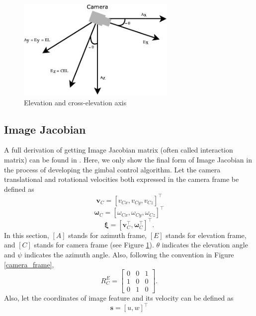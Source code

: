 \begin{figure}[htbp]
	\centering
	\includegraphics[width = 3in]{images/chapter2/cross_elevation.pdf}
	\caption{Elevation and cross-elevation axis}
	\label{cross_elevation}
\end{figure}
\subsection{Image Jacobian}
A full derivation of getting Image Jacobian matrix (often called interaction matrix) can be found in \cite{spong2006robot}. Here, we only show the final form of Image Jacobian in the process of developing the gimbal control algorithm. Let the camera translational and rotational velocities both expressed in the camera frame be defined as
\begin{equation}
\mathbf{v}_C=[v_{Cx}, v_{Cy}, v_{Cz}]^\top
\end{equation}
\begin{equation}
\mathbf{\omega}_C=[\omega_{Cx}, \omega_{Cy}, \omega_{Cz}]^\top
\end{equation}
\begin{equation}
\mathbf{\xi}=[\mathbf{v}_C^\top, \mathbf{\omega}_C^\top]^\top.
\label{camera_velocity}
\end{equation}
In this section, $[A]$ stands for azimuth frame, $[E]$ stands for elevation frame, and $[C]$ stands for camera frame (see Figure \ref{cross_elevation}). $\theta$ indicates the elevation angle and $\psi$ indicates the azimuth angle. Also, following the convention in Figure \ref{camera_frame}, 
\begin{equation}
R^{E}_C =
\begin{bmatrix}
0 & 0 & 1 \\
1 & 0 & 0 \\
0 & 1 & 0
\end{bmatrix}.
\end{equation}
Also, let the coordinates of image feature and its velocity can be defined as 
\begin{equation}
\mathbf{s}=[u, w]^\top
\end{equation}

